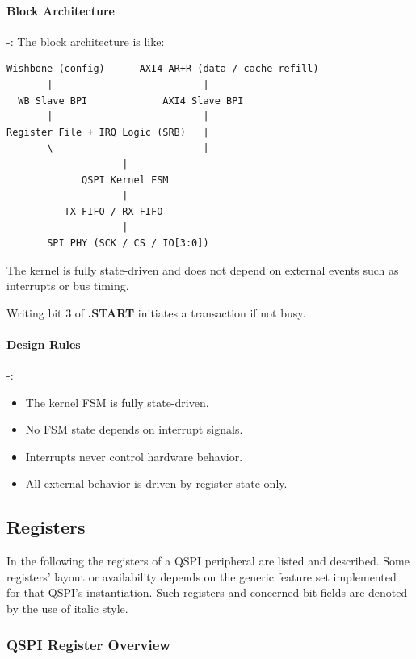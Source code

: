 \paragraph{Block Architecture} -:
The block architecture is like:
\begin{verbatim}
Wishbone (config)      AXI4 AR+R (data / cache-refill)
       |                          |
  WB Slave BPI             AXI4 Slave BPI
       |                          |
Register File + IRQ Logic (SRB)   |
       \__________________________|
                    |
             QSPI Kernel FSM
                    |
          TX FIFO / RX FIFO
                    |
       SPI PHY (SCK / CS / IO[3:0])
\end{verbatim}

The kernel is fully state-driven and does not depend on external events such as interrupts or bus timing.

Writing bit 3 of \asqspiCtrlRegExt\textbf{.START} initiates a transaction if not busy.

\paragraph{Design Rules} -:
\begin{itemize}
  \item The kernel FSM is fully state-driven.
  \item No FSM state depends on interrupt signals.
  \item Interrupts never control hardware behavior.
  \item All external behavior is driven by register state only.
\end{itemize}

\subsection{Registers}
In the following the registers of a QSPI peripheral are listed and described. Some registers’ layout or availability depends on the generic feature set implemented for that QSPI’s instantiation. Such registers and concerned bit fields are denoted by the use of italic style.

\subsubsection{QSPI Register Overview}

